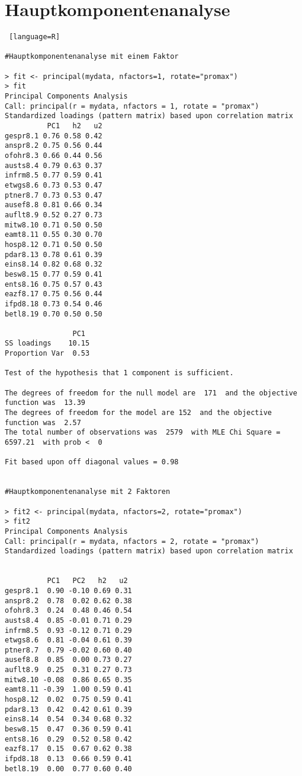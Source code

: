 \section{Hauptkomponentenanalyse}
\begin{lstlisting} [language=R]

#Hauptkomponentenanalyse mit einem Faktor

> fit <- principal(mydata, nfactors=1, rotate="promax")
> fit
Principal Components Analysis
Call: principal(r = mydata, nfactors = 1, rotate = "promax")
Standardized loadings (pattern matrix) based upon correlation matrix
          PC1   h2   u2
gespr8.1 0.76 0.58 0.42
anspr8.2 0.75 0.56 0.44
ofohr8.3 0.66 0.44 0.56
austs8.4 0.79 0.63 0.37
infrm8.5 0.77 0.59 0.41
etwgs8.6 0.73 0.53 0.47
ptner8.7 0.73 0.53 0.47
ausef8.8 0.81 0.66 0.34
auflt8.9 0.52 0.27 0.73
mitw8.10 0.71 0.50 0.50
eamt8.11 0.55 0.30 0.70
hosp8.12 0.71 0.50 0.50
pdar8.13 0.78 0.61 0.39
eins8.14 0.82 0.68 0.32
besw8.15 0.77 0.59 0.41
ents8.16 0.75 0.57 0.43
eazf8.17 0.75 0.56 0.44
ifpd8.18 0.73 0.54 0.46
betl8.19 0.70 0.50 0.50

                PC1
SS loadings    10.15
Proportion Var  0.53

Test of the hypothesis that 1 component is sufficient.

The degrees of freedom for the null model are  171  and the objective function was  13.39
The degrees of freedom for the model are 152  and the objective function was  2.57 
The total number of observations was  2579  with MLE Chi Square =  6597.21  with prob <  0 

Fit based upon off diagonal values = 0.98


#Hauptkomponentenanalyse mit 2 Faktoren

> fit2 <- principal(mydata, nfactors=2, rotate="promax")
> fit2
Principal Components Analysis
Call: principal(r = mydata, nfactors = 2, rotate = "promax")
Standardized loadings (pattern matrix) based upon correlation matrix


          PC1   PC2   h2   u2
gespr8.1  0.90 -0.10 0.69 0.31
anspr8.2  0.78  0.02 0.62 0.38
ofohr8.3  0.24  0.48 0.46 0.54
austs8.4  0.85 -0.01 0.71 0.29
infrm8.5  0.93 -0.12 0.71 0.29
etwgs8.6  0.81 -0.04 0.61 0.39
ptner8.7  0.79 -0.02 0.60 0.40
ausef8.8  0.85  0.00 0.73 0.27
auflt8.9  0.25  0.31 0.27 0.73
mitw8.10 -0.08  0.86 0.65 0.35
eamt8.11 -0.39  1.00 0.59 0.41
hosp8.12  0.02  0.75 0.59 0.41
pdar8.13  0.42  0.42 0.61 0.39
eins8.14  0.54  0.34 0.68 0.32
besw8.15  0.47  0.36 0.59 0.41
ents8.16  0.29  0.52 0.58 0.42
eazf8.17  0.15  0.67 0.62 0.38
ifpd8.18  0.13  0.66 0.59 0.41
betl8.19  0.00  0.77 0.60 0.40


\end{lstlisting}
